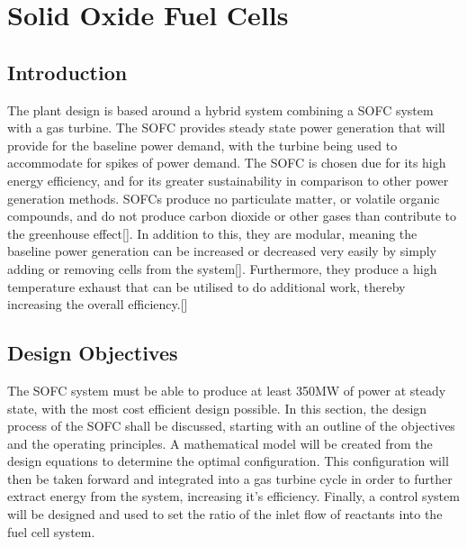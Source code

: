 


%


\section{Solid Oxide Fuel Cells}

\subsection{Introduction}
The plant design is based around a hybrid system combining a SOFC system with a gas turbine. The SOFC provides steady state power generation that will provide for the baseline power demand, with the turbine being used to accommodate for spikes of power demand. The SOFC is chosen due for its high energy efficiency, and for its greater sustainability in comparison to other power generation methods. SOFCs produce no particulate matter, or volatile organic compounds, and do not produce carbon dioxide or other gases than contribute to the greenhouse effect[]. In addition to this, they are modular, meaning the baseline power generation can be increased or decreased very easily by simply adding or removing cells from the system[]. Furthermore, they produce a high temperature exhaust that can be utilised to do additional work, thereby increasing the overall efficiency.[]
\subsection{Design Objectives}
The SOFC system must be able to produce at least 350MW of power at steady state, with the most cost efficient design possible. 
In this section, the design process of the SOFC shall be discussed, starting with an outline of the objectives and the operating principles. A mathematical model will be created from the design equations to determine the optimal configuration. This configuration will then be taken forward and integrated into a gas turbine cycle in order to further extract energy from the system, increasing it’s efficiency. Finally, a control system will be designed and used to set the ratio of the inlet flow of reactants into the fuel cell system.

